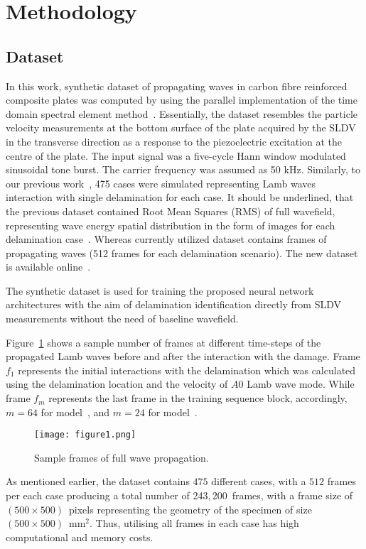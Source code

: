 \section{Methodology}
\subsection{Dataset}
In this work, synthetic dataset of propagating waves in carbon fibre reinforced composite plates was computed by using the parallel implementation of the time domain spectral element method~\cite{Kudela2020}. 
Essentially, the dataset resembles the particle velocity measurements at the bottom surface of the plate acquired by the SLDV in the transverse direction as a response to the piezoelectric excitation at the centre of the plate. 
The input signal was a five-cycle Hann window modulated sinusoidal tone burst. The carrier frequency was assumed as 50 kHz. 
Similarly, to our previous work~\cite{Ijjeh2021}, 475 cases were simulated representing Lamb waves interaction with single delamination for each case. 
It should be underlined, that the previous dataset contained Root Mean Squares (RMS) of full wavefield, representing wave energy spatial distribution in the form of images for each delamination case~\cite{Kudela2020d}. 
Whereas currently utilized dataset contains frames of propagating waves (512 frames for each delamination scenario). 
The new dataset is available online~\cite{kudela_pawel_2021_5414555}.

The synthetic dataset is used for training the proposed neural network architectures with the aim of delamination identification directly from SLDV measurements without the need of baseline wavefield.

Figure~\ref{fig:Full_wave} shows a sample number of frames at different time-steps of the propagated Lamb waves before and after the interaction with the damage.
Frame \(f_{1}\) represents the initial interactions with the delamination which was calculated using the delamination location and the velocity of \(A0\) Lamb wave mode.
While frame \(f_{m}\) represents the last frame in the training sequence block, accordingly, \(m=64\) for model~, and \(m=24\) for model~.
\begin{figure}[!h]
	\centering
	\texttt{[image: figure1.png]}
	\caption{Sample frames of full wave propagation.}
	\label{fig:Full_wave}
\end{figure}

As mentioned earlier, the dataset contains \(475\) different cases, with a \(512\) frames per each case producing a total number of 243,\,200~frames, with a frame size of \((500\times500)\)~pixels representing the geometry of the specimen of size \((500\times500)\)~mm\(^{2}\).
Thus, utilising all frames in each case has high computational and memory costs.

